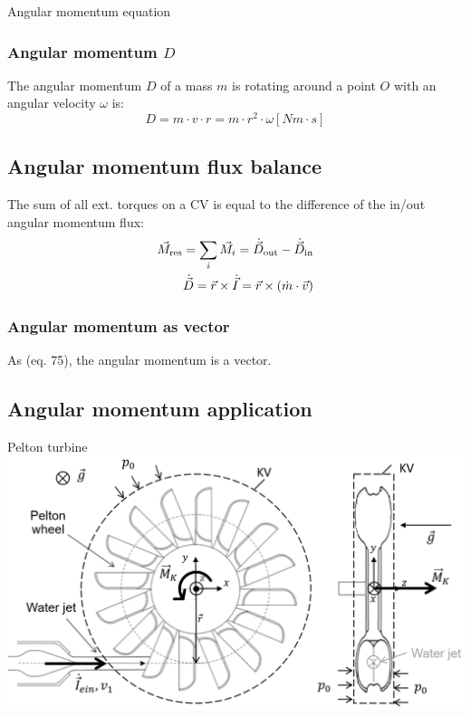 \documentclass{article}
\begin{document}
\begin{multicols}{2}
\begin{theorybox}{Angular momentum equation}
    \subsubsection{Angular momentum $D$}
    The angular momentum $D$ of a mass $m$ is rotating around a point $O$ with an
    angular velocity $\omega$ is:
    \begin{equation}
        D = m\cdot v\cdot r = m\cdot r^2 \cdot \omega \left[Nm\cdot s\right]
    \end{equation}

    \subsection{Angular momentum flux balance}
    The sum of all ext. torques on a CV is equal
    to the difference of the in/out angular momentum flux:
    \vspace*{-0.3cm}
    \begin{align}
        \vec{M}_{\rm res} = \sum_i \vec{M}_i = \dot{\vec{D}}_{\rm out} - \dot{\vec{D}}_{\rm in}\\
        \dot{\vec{D}} = \vec{r} \times \dot{\vec{I}} = \vec{r} \times \left(\dot{m}\cdot \vec{v}\right)
    \end{align}

    \subsubsection{Angular momentum as vector}
    As (eq. 75), the angular momentum is a vector.
\end{theorybox}
\vfill
\columnbreak

\subsection{Angular momentum application}
\begin{examplebox}{Pelton turbine}
        \includegraphics[width=\textwidth]{media/peltonlaufrad_drall_en.png}


\end{examplebox}
\end{multicols}
\end{document}
